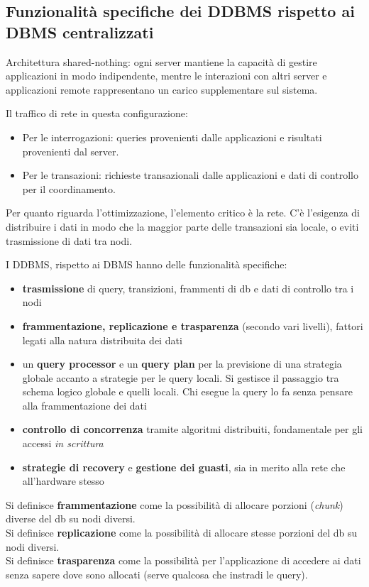 \subsection{Funzionalità specifiche dei DDBMS rispetto ai DBMS centralizzati}

Architettura shared-nothing: ogni server mantiene la capacità di gestire applicazioni in modo indipendente, mentre le interazioni con altri server e applicazioni remote rappresentano un carico supplementare sul sistema.

Il traffico di rete in questa configurazione:
\begin{itemize}
    \item Per le interrogazioni: queries provenienti dalle applicazioni e risultati provenienti dal server.
    \item Per le transazioni: richieste transazionali dalle applicazioni e dati di controllo per il coordinamento.
\end{itemize}

Per quanto riguarda l’ottimizzazione, l’elemento critico è la rete. C’è l’esigenza di distribuire i dati in modo che la maggior parte delle transazioni sia locale, o eviti trasmissione di dati tra nodi. 

I DDBMS, rispetto ai DBMS hanno delle funzionalità specifiche:
\begin{itemize}
    \item \textbf{trasmissione} di query, transizioni, frammenti di db e dati di controllo tra i nodi 
    \item \textbf{frammentazione, replicazione e trasparenza} (secondo vari livelli), fattori legati alla natura distribuita dei dati 
    \item un \textbf{query processor} e un \textbf{query plan} per la previsione di una strategia globale accanto a strategie per le query locali. Si gestisce il passaggio tra schema logico globale e quelli locali. Chi esegue la query lo fa senza pensare alla frammentazione dei dati 
    \item \textbf{controllo di concorrenza} tramite algoritmi distribuiti, fondamentale per gli accessi \textit{in scrittura} 
    \item \textbf{strategie di recovery} e \textbf{gestione dei guasti}, sia in merito alla rete che all'hardware stesso 
\end{itemize}

Si definisce \textbf{frammentazione} come la possibilità di allocare porzioni (\textit{chunk}) diverse del db su nodi diversi.\\ Si definisce \textbf{replicazione} come la possibilità di allocare stesse porzioni del db su nodi diversi.\\ Si definisce \textbf{trasparenza} come la possibilità per l'applicazione di accedere ai dati senza sapere dove sono allocati (serve qualcosa che instradi le query).


